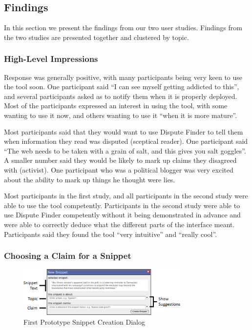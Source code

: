 \documentclass{www2010-submission}
\begin{document}
\subsection{Findings}

In this section we present the findings from our two user studies. Findings from the two studies are presented together and clustered by topic.

\subsubsection{High-Level Impressions}

Response was generally positive, with many participants being very keen to use the tool soon. One participant said ``I can see myself getting addicted to this'', and several participants asked as to notify them when it is properly deployed. Most of the participants expressed an interest in using the tool, with some wanting to use it now, and others wanting to use it ``when it is more mature''.

Most participants said that they would want to use Dispute Finder to tell them when information they read was disputed (sceptical reader). One participant said ``The web needs to be taken with a grain of salt, and this gives you salt goggles''. A smaller number said they would be likely to mark up claims they disagreed with (activist). One participant who was a political blogger was very excited about the ability to mark up things he thought were lies.

Most participants in the first study, and all participants in the second study were able to use the tool competently. Participants in the second study were able to use Dispute Finder competently without it being demonstrated in advance and were able to correctly deduce what the different parts of the interface meant. Participants said they found the tool ``very intuitive'' and ``really cool''.

\subsubsection{Choosing a Claim for a Snippet}

\begin{figure}[t]
	\includegraphics[width=8.5cm]{../screenshots/oldsnipcreate_diagram.png}
	\caption{First Prototype Snippet Creation Dialog}
	\label{oldsnippetbox}
\end{figure}
\end{document}
